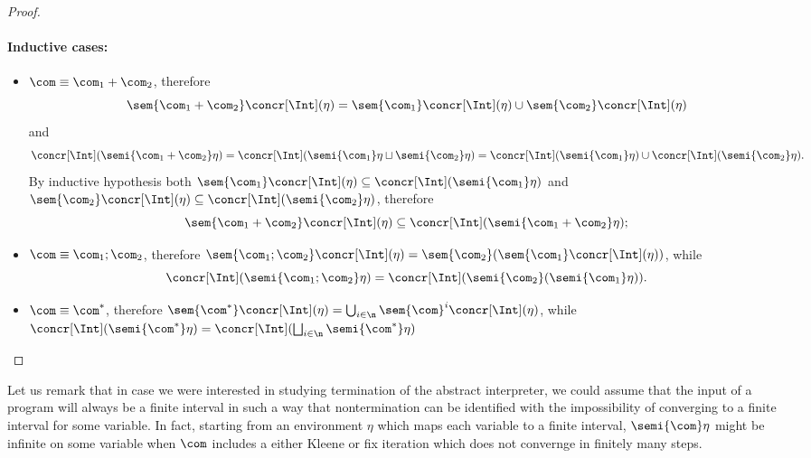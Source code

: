 \begin{proof}
  \paragraph*{Inductive cases:\\}
  \begin{itemize}
  \item \(\com \equiv \com_1 + \com_2\), therefore \[\sem{\com_1 +
        \com_2}\concr[\Int](\eta) = \sem{\com_1}\concr[\Int](\eta) \cup
      \sem{\com_2}\concr[\Int](\eta)\] and \[\concr[\Int](\semi{\com_1 +
        \com_2}\eta) = \concr[\Int](\semi{\com_1}\eta \sqcup
      \semi{\com_2}\eta) = \concr[\Int](\semi{\com_1}\eta) \cup
      \concr[\Int](\semi{\com_2}\eta).\] By inductive hypothesis both
    \(\sem{\com_1}\concr[\Int](\eta) \subseteq
    \concr[\Int](\semi{\com_1}\eta)\) and
    \(\sem{\com_2}\concr[\Int](\eta) \subseteq
    \concr[\Int](\semi{\com_2}\eta)\), therefore \[\sem{\com_1 +
        \com_2}\concr[\Int](\eta) \subseteq \concr[\Int](\semi{\com_1 +
        \com_2}\eta);\]
  \item \(\com \equiv \com_1 ; \com_2\), therefore
    \(\sem{\com_1;\com_2}\concr[\Int](\eta) =
    \sem{\com_2}(\sem{\com_1}\concr[\Int](\eta))\), while
    \[\concr[\Int](\semi{\com_1; \com_2}\eta) =
      \concr[\Int] (\semi{\com_2}( \semi{\com_1}\eta)).\]
  \item \(\com \equiv \com^*\), therefore
    \(\sem{\com^*}\concr[\Int](\eta) =
    \bigcup_{i\in\n}\sem{\com}^i\concr[\Int](\eta)\), while
    \(\concr[\Int](\semi{\com^*}\eta) =
    \concr[\Int](\bigsqcup_{i\in\n}\semi{\com^*}\eta)\)
  \end{itemize}
\end{proof}

\begin{remark}
  Let us remark that in case we were interested in studying
  termination of the abstract interpreter, we could assume that the
  input of a program will always be a finite interval in such a way
  that nontermination can be identified with the impossibility of
  converging to a finite interval for some variable. In fact, starting
  from an environment \(\eta\) which maps each variable to a finite
  interval, \(\semi{\com}\eta\) might be infinite on some variable
  when \(\com\) includes a either Kleene or fix iteration which does
  not convernge in finitely many steps.
\end{remark}